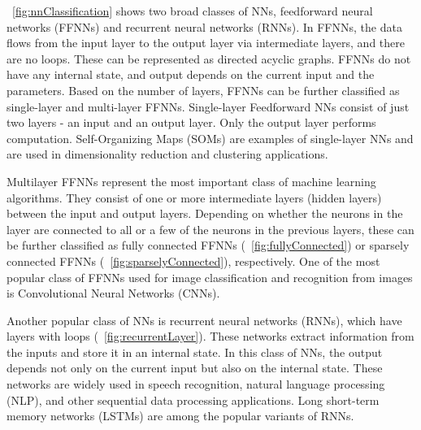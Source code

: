 \documentclass[a4paper,10pt]{article}
\begin{document}
\figurename{~\ref{fig:nnClassification}} shows two broad classes of NNs, feedforward neural networks (FFNNs) and recurrent neural networks (RNNs). In FFNNs, the data flows from the input layer to the output layer via intermediate layers, and there are no loops. These can be represented as directed acyclic graphs. FFNNs do not have any internal state, and output depends on the current input and the parameters. Based on the number of layers, FFNNs can be further classified as single-layer and multi-layer FFNNs. Single-layer Feedforward NNs consist of just two layers - an input and an output layer. Only the output layer performs computation. Self-Organizing Maps (SOMs) are examples of single-layer NNs and are used in dimensionality reduction and clustering applications. 

Multilayer FFNNs represent the most important class of machine learning algorithms. They consist of one or more intermediate layers (hidden layers) between the input and output layers. Depending on whether the neurons in the layer are connected to all or a few of the neurons in the previous layers, these can be further classified as fully connected FFNNs (\figurename{~\ref{fig:fullyConnected}}) or sparsely connected FFNNs (\figurename{~\ref{fig:sparselyConnected}}), respectively. One of the most popular class of FFNNs used for image classification and recognition from images is Convolutional Neural Networks (CNNs).

Another popular class of NNs is recurrent neural networks (RNNs), which have layers with loops (\figurename{~\ref{fig:recurrentLayer}}). These networks extract information from the inputs and store it in an internal state. In this class of NNs, the output depends not only on the current input but also on the internal state. These networks are widely used in speech recognition, natural language processing (NLP), and other sequential data processing applications. Long short-term memory networks (LSTMs) are among the popular variants of RNNs.
\end{document}

